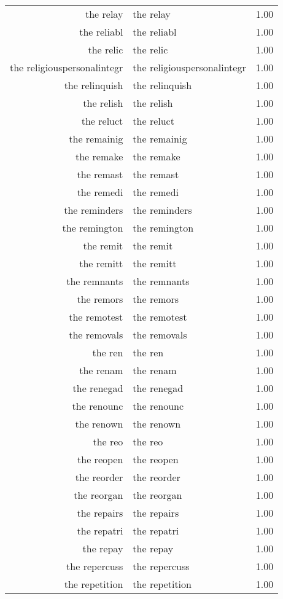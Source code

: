 \begin{table}[ht]
\begin{tabular}{rlr}
  the relay & the relay & 1.00 \\ 
  the reliabl & the reliabl & 1.00 \\ 
  the relic & the relic & 1.00 \\ 
  the religiouspersonalintegr & the religiouspersonalintegr & 1.00 \\ 
  the relinquish & the relinquish & 1.00 \\ 
  the relish & the relish & 1.00 \\ 
  the reluct & the reluct & 1.00 \\ 
  the remainig & the remainig & 1.00 \\ 
  the remake & the remake & 1.00 \\ 
  the remast & the remast & 1.00 \\ 
  the remedi & the remedi & 1.00 \\ 
  the reminders & the reminders & 1.00 \\ 
  the remington & the remington & 1.00 \\ 
  the remit & the remit & 1.00 \\ 
  the remitt & the remitt & 1.00 \\ 
  the remnants & the remnants & 1.00 \\ 
  the remors & the remors & 1.00 \\ 
  the remotest & the remotest & 1.00 \\ 
  the removals & the removals & 1.00 \\ 
  the ren & the ren & 1.00 \\ 
  the renam & the renam & 1.00 \\ 
  the renegad & the renegad & 1.00 \\ 
  the renounc & the renounc & 1.00 \\ 
  the renown & the renown & 1.00 \\ 
  the reo & the reo & 1.00 \\ 
  the reopen & the reopen & 1.00 \\ 
  the reorder & the reorder & 1.00 \\ 
  the reorgan & the reorgan & 1.00 \\ 
  the repairs & the repairs & 1.00 \\ 
  the repatri & the repatri & 1.00 \\ 
  the repay & the repay & 1.00 \\ 
  the repercuss & the repercuss & 1.00 \\ 
  the repetition & the repetition & 1.00 \\ 

\end{tabular}
\end{table}

